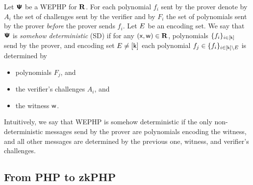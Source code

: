 \documentclass[runningheads,11pt]{llncs}
\begin{document}
\begin{definition}
  \label{def:sdwephp}
  Let $\bm{\mathsf{\Psi}}$ be a WEPHP for $\mathbf{R}$. For each polynomial $f_i$ sent by the prover
  denote by $A_i$ the set of challenges sent by the verifier and by $F_i$ the
  set of polynomials sent by the prover \emph{before} the prover sends
  $f_i$. Let $E$ be an encoding set. We say that $\bm{\mathsf{\Psi}}$ is \emph{somehow
    deterministic} (SD) if for any $(\mathsf{x}, \mathsf{w}) \in \mathbf{R}$, polynomials
  $\{f_i\}_{i \in [\mathsf{k}]}$ send by the prover, and encoding set
  $E \neq [\mathsf{k}]$ each polynomial
  $f_j \in \{f_i\}_{i \in [\mathsf{k}] \setminus E}$ is determined by
  \begin{itemize}
    \item polynomials $F_j$, and
    \item the verifier's challenges $A_i$, and
    \item the witness $\mathsf{w}$.
  \end{itemize}
\end{definition}
Intuitively, we say that WEPHP is somehow deterministic if the only
non-deterministic messages send by the prover are polynomials encoding the
witness, and all other messages are determined by the previous one, witness, and
verifier's challenges.

\subsection{From PHP to zkPHP}
\end{document}
